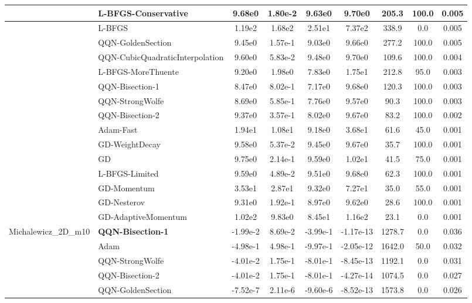 \documentclass[10pt]{article}
\begin{document}
\begin{longtable}{|l|l|c|c|c|c|c|c|c|}
\hline
 & L-BFGS-Conservative & 9.68e0 & 1.80e-2 & 9.63e0 & 9.70e0 & 205.3 & 100.0 & 0.005 \\
\hline
 & L-BFGS & 1.19e2 & 1.68e2 & 2.51e1 & 7.37e2 & 338.9 & 0.0 & 0.005 \\
\hline
 & QQN-GoldenSection & 9.45e0 & 1.57e-1 & 9.03e0 & 9.66e0 & 277.2 & 100.0 & 0.005 \\
\hline
 & QQN-CubicQuadraticInterpolation & 9.60e0 & 5.83e-2 & 9.48e0 & 9.70e0 & 109.6 & 100.0 & 0.004 \\
\hline
 & L-BFGS-MoreThuente & 9.20e0 & 1.98e0 & 7.83e0 & 1.75e1 & 212.8 & 95.0 & 0.003 \\
\hline
 & QQN-Bisection-1 & 8.47e0 & 8.02e-1 & 7.17e0 & 9.68e0 & 120.3 & 100.0 & 0.003 \\
\hline
 & QQN-StrongWolfe & 8.69e0 & 5.85e-1 & 7.76e0 & 9.57e0 & 90.3 & 100.0 & 0.003 \\
\hline
 & QQN-Bisection-2 & 9.37e0 & 3.57e-1 & 8.02e0 & 9.67e0 & 83.2 & 100.0 & 0.002 \\
\hline
 & Adam-Fast & 1.94e1 & 1.08e1 & 9.18e0 & 3.68e1 & 61.6 & 45.0 & 0.001 \\
\hline
 & GD-WeightDecay & 9.58e0 & 5.37e-2 & 9.45e0 & 9.67e0 & 35.7 & 100.0 & 0.001 \\
\hline
 & GD & 9.75e0 & 2.14e-1 & 9.59e0 & 1.02e1 & 41.5 & 75.0 & 0.001 \\
\hline
 & L-BFGS-Limited & 9.59e0 & 4.89e-2 & 9.51e0 & 9.68e0 & 62.3 & 100.0 & 0.001 \\
\hline
 & GD-Momentum & 3.53e1 & 2.87e1 & 9.32e0 & 7.27e1 & 35.0 & 55.0 & 0.001 \\
\hline
 & GD-Nesterov & 9.31e0 & 1.92e-1 & 8.97e0 & 9.62e0 & 28.6 & 100.0 & 0.001 \\
\hline
 & GD-AdaptiveMomentum & 1.02e2 & 9.83e0 & 8.45e1 & 1.16e2 & 23.1 & 0.0 & 0.001 \\
Michalewicz\_2D\_m10 & \textbf{QQN-Bisection-1} & -1.99e-2 & 8.69e-2 & -3.99e-1 & -1.17e-13 & 1278.7 & 0.0 & 0.036 \\
\hline
 & Adam & -4.98e-1 & 4.98e-1 & -9.97e-1 & -2.05e-12 & 1642.0 & 50.0 & 0.032 \\
\hline
 & QQN-StrongWolfe & -4.01e-2 & 1.75e-1 & -8.01e-1 & -8.45e-13 & 1192.1 & 0.0 & 0.031 \\
\hline
 & QQN-Bisection-2 & -4.01e-2 & 1.75e-1 & -8.01e-1 & -4.27e-14 & 1074.5 & 0.0 & 0.027 \\
\hline
 & QQN-GoldenSection & -7.52e-7 & 2.11e-6 & -9.60e-6 & -8.52e-13 & 1573.8 & 0.0 & 0.026 \\

\end{longtable}
\end{document}

